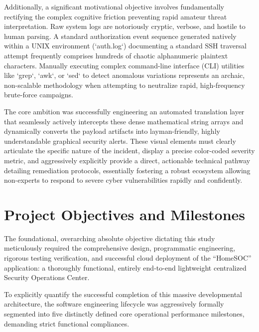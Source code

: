 Additionally, a significant motivational objective involves fundamentally rectifying the complex cognitive friction preventing rapid amateur threat interpretation. Raw system logs are notoriously cryptic, verbose, and hostile to human parsing. A standard authorization event sequence generated natively within a UNIX environment (`auth.log`) documenting a standard SSH traversal attempt frequently comprises hundreds of chaotic alphanumeric plaintext characters. Manually executing complex command-line interface (CLI) utilities like `grep`, `awk`, or `sed` to detect anomalous variations represents an archaic, non-scalable methodology when attempting to neutralize rapid, high-frequency brute-force campaigns. 

The core ambition was successfully engineering an automated translation layer that seamlessly actively intercepts these dense mathematical string arrays and dynamically converts the payload artifacts into layman-friendly, highly understandable graphical security alerts. These visual elements must clearly articulate the specific nature of the incident, display a precise color-coded severity metric, and aggressively explicitly provide a direct, actionable technical pathway detailing remediation protocols, essentially fostering a robust ecosystem allowing non-experts to respond to severe cyber vulnerabilities rapidly and confidently.

\section{Project Objectives and Milestones}
The foundational, overarching absolute objective dictating this study meticulously required the comprehensive design, programmatic engineering, rigorous testing verification, and successful cloud deployment of the ``HomeSOC'' application: a thoroughly functional, entirely end-to-end lightweight centralized Security Operations Center. 

To explicitly quantify the successful completion of this massive developmental architecture, the software engineering lifecycle was aggressively formally segmented into five distinctly defined core operational performance milestones, demanding strict functional compliances.

